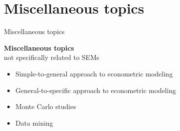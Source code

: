 \documentclass[usenames,dvipsnames]{beamer}
\begin{document}
\section{Miscellaneous topics}
\begin{frame}{Miscellaneous topics}

\textbf{Miscellaneous topics}\\
not specifically  related to SEMs\\
\medskip
\begin{itemize}
\item Simple-to-general approach to econometric modeling
\item General-to-specific approach to econometric modeling\\
\bigskip
\item Monte Carlo studies\\
\bigskip
\item Data mining
\end{itemize}
\end{frame}
\end{document}
